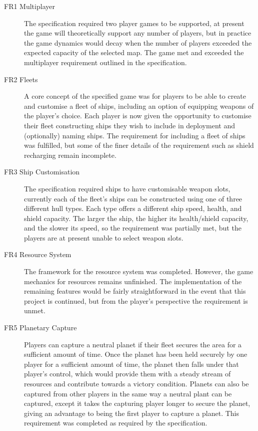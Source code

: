 \begin{description}
  \item[FR1 Multiplayer] The specification required two player games to be supported, at present the game will theoretically support any number of players, but in practice the game dynamics would decay when the number of players exceeded the expected capacity of the selected map. The game met and exceeded the multiplayer requirement outlined in the specification.

  \item[FR2 Fleets] A core concept of the specified game was for players to be able to create and customise a fleet of ships, including an option of equipping weapons of the player's choice. Each player is now given the opportunity to customise their fleet constructing ships they wish to include in deployment and (optionally) naming ships. The requirement for including a fleet of ships was fulfilled, but some of the finer details of the requirement such as shield recharging remain incomplete.

  \item[FR3 Ship Customisation] The specification required ships to have customisable weapon slots, currently each of the fleet's ships can be constructed using one of three different hull types. Each type offers a different ship speed, health, and shield capacity. The larger the ship, the higher its health/shield capacity, and the slower its speed, so the requirement was partially met, but the players are at present unable to select weapon slots.

  \item[FR4 Resource System] The framework for the resource system was completed. However, the game mechanics for resources remains unfinished. The implementation of the remaining features would be fairly straightforward in the event that this project is continued, but from the player's perspective the requirement is unmet.

  \item[FR5 Planetary Capture] Players can capture a neutral planet if their fleet secures the area for a sufficient amount of time. Once the planet has been held securely by one player for a sufficient amount of time, the planet then falls under that player's control, which would provide them with a steady stream of resources and contribute towards a victory condition. Planets can also be captured from other players in the same way a neutral plant can be captured, except it takes the capturing player longer to secure the planet, giving an advantage to being the first player to capture a planet. This requirement was completed as required by the specification.


\end{description}
